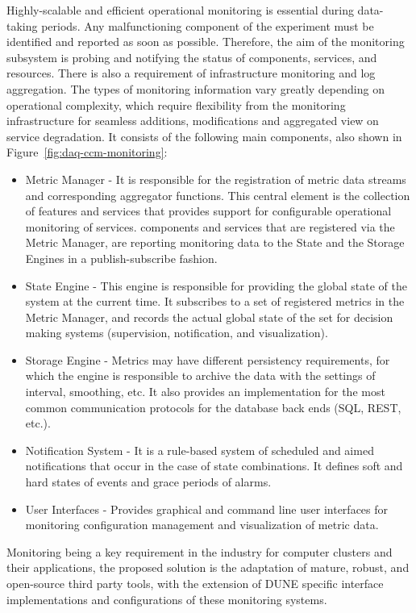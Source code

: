 Highly-scalable and efficient operational monitoring is essential during data-taking periods. Any malfunctioning component of the experiment must be identified and reported as soon as possible. Therefore, the aim of the monitoring subsystem is probing and notifying the status of  components, services, and resources. There is also a requirement of  infrastructure monitoring and log aggregation. The types of monitoring information vary greatly depending on operational complexity, which require flexibility from the monitoring infrastructure for seamless additions, modifications and aggregated view on service degradation.
It consists of the following main components, also shown in Figure~\ref{fig:daq-ccm-monitoring}:


\begin{itemize}
  \item Metric Manager - It is responsible for the registration of metric data streams and corresponding aggregator functions. This central element is the collection of features and services that provides support for configurable operational monitoring of  services.  components and services that are registered via the Metric Manager, are reporting monitoring data to the State and the Storage Engines in a publish-subscribe fashion. 
  \item State Engine - This engine is responsible for providing the global state of the system at the current time. It subscribes to a set of registered metrics in the Metric Manager, and records the actual global state of the set for decision making systems (supervision, notification, and visualization).
  \item Storage Engine - Metrics may have different persistency requirements, for which the engine is responsible to archive the data with the settings of interval, smoothing, etc. It also provides an implementation for the most common communication protocols for the database back ends (SQL, REST, etc.).
  \item Notification System - It is a rule-based system of scheduled and aimed notifications that occur in the case of state combinations. It defines soft and hard states of events and grace periods of alarms.
  \item User Interfaces - Provides graphical and command line user interfaces for monitoring configuration management and visualization of metric data.
\end{itemize}

Monitoring being a key requirement in the industry for computer clusters and their applications, the proposed solution is the adaptation of mature, robust, and open-source third party tools, with the extension of DUNE  specific interface implementations and configurations of these monitoring systems. 


